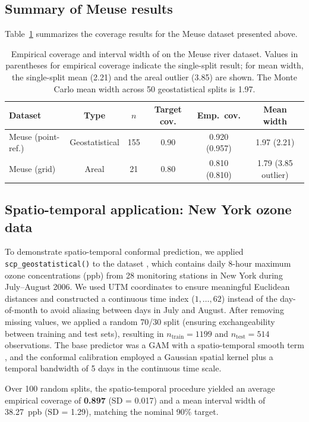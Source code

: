 \documentclass[article]{jss}
\begin{document}
\subsection{Summary of Meuse results}

Table~\ref{tab:realdata} summarizes the coverage results for the Meuse dataset presented above.

\begin{table}[t!]
\centering
\begin{tabular}{lccccc}
\toprule
Dataset & Type & $n$ & Target cov. & Emp.\ cov. & Mean width \\
\midrule
Meuse (point-ref.) & Geostatistical & 155 & 0.90 & 0.920 (0.957) & 1.97 (2.21) \\
Meuse (grid) & Areal & 21 & 0.80 & 0.810 (0.810) & 1.79 (3.85 outlier) \\
\bottomrule
\end{tabular}
\caption{Empirical coverage and interval width of  on the Meuse river dataset. Values in parentheses for empirical coverage indicate the single-split result; for mean width, the single-split mean (2.21) and the areal outlier (3.85) are shown. The Monte Carlo mean width across 50 geostatistical splits is 1.97.}
\label{tab:realdata}
\end{table}

\subsection{Spatio-temporal application: New York ozone data}

To demonstrate spatio-temporal conformal prediction, we applied \texttt{scp\_geostatistical()} to the  dataset \citep{Sahu:bmstdr}, which contains daily 8-hour maximum ozone concentrations (ppb) from 28 monitoring stations in New York during July--August 2006. We used UTM coordinates to ensure meaningful Euclidean distances and constructed a continuous time index ($1, \dots, 62$) instead of the day-of-month to avoid aliasing between days in July and August. After removing missing values, we applied a random 70/30 split (ensuring exchangeability between training and test sets), resulting in $n_{\text{train}} = 1199$ and $n_{\text{test}} = 514$ observations. The base predictor was a GAM with a spatio-temporal smooth term , and the conformal calibration employed a Gaussian spatial kernel plus a temporal bandwidth of 5 days in the continuous time scale.

Over 100 random splits, the spatio-temporal procedure yielded an average empirical coverage of \textbf{0.897} (SD = 0.017) and a mean interval width of 38.27~ppb (SD = 1.29), matching the nominal 90\% target.
\end{document}

